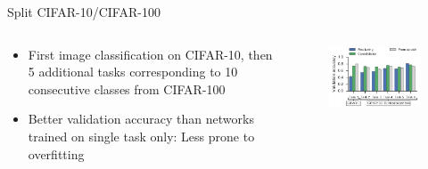 \documentclass{beamer}
\begin{document}
\begin{frame}{Split CIFAR-10/CIFAR-100}
\begin{columns}
	\begin{column}{0.5\textwidth}
		\begin{itemize}
			\item First image classification on CIFAR-10, then 5 additional tasks  corresponding to 10 consecutive classes from CIFAR-100
			\item<2-> Better validation accuracy than networks trained on single task only: Less prone to overfitting
		\end{itemize}
	\end{column}
	\begin{column}{0.5\textwidth}
		\begin{figure}
			
			\centering
			\includegraphics[width=\textwidth]{ML4}
		\end{figure}
	\end{column}
\end{columns}

\end{frame}
\end{document}

